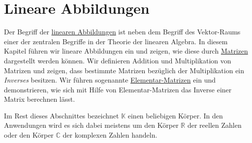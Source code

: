 \chapter{Lineare Abbildungen}
Der Begriff der \href{https://de.wikipedia.org/wiki/Lineare_Abbildung}{linearen Abbildungen} ist neben dem
Begriff des Vektor-Raums einer der zentralen Begriffe in der Theorie der linearen Algebra.  In diesem Kapitel
f\"{u}hren wir lineare Abbildungen ein und zeigen, wie diese durch
\href{https://de.wikipedia.org/wiki/Matrix_(Mathematik)}{Matrizen} dargestellt 
werden k\"{o}nnen.  Wir definieren Addition und Multiplikation von Matrizen und zeigen, dass bestimmte Matrizen
bez\"{u}glich der Multiplikation ein {\emph{\color{blue}Inverses}} besitzen.  Wir f\"{u}hren sogenannte
\href{https://de.wikipedia.org/wiki/Elementarmatrix}{Elementar-Matrizen} ein und demonstrieren, wie
sich mit Hilfe von Elementar-Matrizen das Inverse einer Matrix berechnen l\"{a}sst.   

Im Rest dieses Abschnittes bezeichnet $\mathbb{K}$ einen beliebigen K\"{o}rper.  In den Anwendungen wird es sich dabei
meistens um den K\"{o}rper $\mathbb{R}$ der reellen Zahlen oder den K\"{o}rper $\mathbb{C}$ der komplexen Zahlen handeln.  

